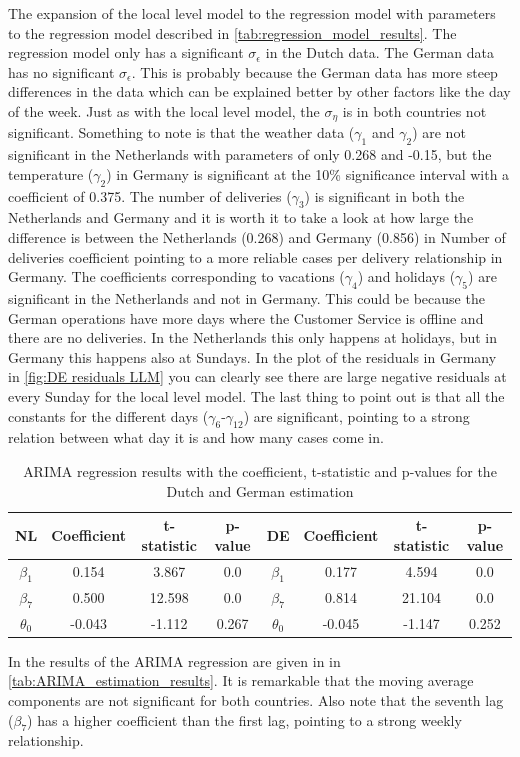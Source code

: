 The expansion of the local level model to the regression model with parameters to the regression model described in \autoref{tab:regression_model_results}. The regression model only has a significant $\sigma_{\epsilon}$ in the Dutch data. The German data has no significant $\sigma_\epsilon$. This is probably because the German data has more steep differences in the data which can be explained better by other factors like the day of the week. Just as with the local level model, the $\sigma_\eta$ is in both countries not significant. Something to note is that the weather data ($\gamma_1$ and $\gamma_2$) are not significant in the Netherlands with parameters of only 0.268 and -0.15, but the temperature ($\gamma_2$) in Germany is significant at the 10\% significance interval with a coefficient of 0.375. The number of deliveries ($\gamma_3$) is significant in both the Netherlands and Germany and it is worth it to take a look at how large the difference is between the Netherlands (0.268) and Germany (0.856) in Number of deliveries coefficient pointing to a more reliable cases per delivery relationship in Germany. The coefficients corresponding to vacations ($\gamma_4$) and holidays ($\gamma_5$) are significant in the Netherlands and not in Germany. This could be because the German operations have more days where the Customer Service is offline and there are no deliveries. In the Netherlands this only happens at holidays, but in Germany this happens also at Sundays. In the plot of the residuals in Germany in \autoref{fig:DE residuals LLM} you can clearly see there are large negative residuals at every Sunday for the local level model. The last thing to point out is that all the constants for the different days ($\gamma_6$-$\gamma_{12}$) are significant, pointing to a strong relation between what day it is and how many cases come in.\\

\begin{table}[]
    \centering
    \begin{tabular}{|c|c c c||c|c c c|}\hline
        NL & Coefficient & t-statistic & p-value & DE & Coefficient & t-statistic & p-value\\\hline
        $\beta_1$ & 0.154 & 3.867 & 0.0 & $\beta_1$ & 0.177 & 4.594 & 0.0\\
        $\beta_7$ & 0.500 & 12.598 & 0.0 & $\beta_7$ & 0.814 & 21.104 & 0.0\\
        $\theta_0$ & -0.043 & -1.112 & 0.267 & $\theta_0$ & -0.045 & -1.147 & 0.252\\\hline
    \end{tabular}
    \caption{ARIMA regression results with the coefficient, t-statistic and p-values for the Dutch and German estimation}
    \label{tab:ARIMA_estimation_results}
\end{table}
In the results of the ARIMA regression are given in in \autoref{tab:ARIMA_estimation_results}. It is remarkable that the moving average components are not significant for both countries. Also note that the seventh lag ($\beta_7$) has a higher coefficient than the first lag, pointing to a strong weekly relationship.\\

